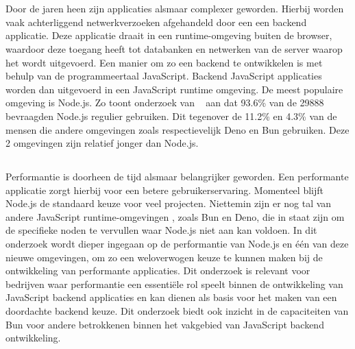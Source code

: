 
\chapter{}%
\label{ch:inleiding}


Door de jaren heen zijn applicaties alsmaar complexer geworden. Hierbij worden vaak achterliggend netwerkverzoeken afgehandeld door een 
een backend applicatie. Deze applicatie draait in een runtime-omgeving buiten de browser, 
waardoor deze toegang heeft tot databanken en netwerken van de server waarop het wordt uitgevoerd.
Een manier om zo een backend te ontwikkelen is met behulp van de programmeertaal JavaScript. 
Backend JavaScript applicaties worden dan uitgevoerd in een JavaScript runtime omgeving.
De meest populaire omgeving is Node.js. Zo toont onderzoek van ~\textcite{Greif2022} aan dat 93.6\% van de 29888 bevraagden Node.js 
regulier gebruiken.
Dit tegenover de 11.2\% en 4.3\% van de mensen die andere omgevingen zoals respectievelijk Deno en Bun gebruiken.
Deze 2 omgevingen zijn relatief jonger dan Node.js.

\section{}%
\label{sec:probleemstelling}

Performantie is doorheen de tijd alsmaar belangrijker geworden. 
Een performante applicatie zorgt hierbij voor een betere gebruikerservaring. 
Momenteel blijft Node.js de standaard keuze voor veel projecten. Niettemin zijn er nog tal van andere JavaScript runtime-omgevingen
, zoals Bun en Deno, die in staat zijn om de specifieke noden te vervullen waar Node.js niet aan kan voldoen. 
In dit onderzoek wordt dieper ingegaan op de performantie van Node.js en één van deze nieuwe omgevingen,
om zo een weloverwogen keuze te kunnen maken bij de ontwikkeling van performante applicaties.
Dit onderzoek is relevant voor bedrijven waar performantie een essentiële rol speelt binnen de ontwikkeling van JavaScript backend applicaties en kan dienen als basis 
voor het maken van een doordachte backend keuze. Dit onderzoek 
biedt ook inzicht in de capaciteiten van Bun voor andere betrokkenen binnen het vakgebied van JavaScript backend ontwikkeling.


